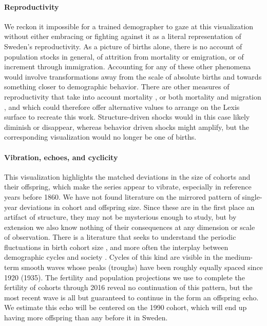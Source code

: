 \documentclass{article}
\begin{document}
\paragraph{Reproductivity}
We reckon it impossible for a trained demographer to gaze at this visualization without either embracing or fighting against it as a literal representation of Sweden's reproductivity. As a picture of births alone, there is no account of population stocks in general, of attrition from mortality or emigration, or of increment through immigration. Accounting for any of these other phenomena would involve transformations away from the scale of absolute births and towards something closer to demographic behavior. There are other measures of reproductivity that take into account mortality \citep{kuczynski1932fertility}, or both mortality and migration \citep[][inter alia]{hyrenius1951reproduction,ortega2007birth,preston2007intrinsic,wilson2013migration,ediev2014new}, and which could therefore offer alternative values to arrange on the Lexis surface to recreate this work. Structure-driven shocks would in this case likely diminish or disappear, whereas behavior driven shocks might amplify, but the corresponding visualization would no longer be one of births. 

\paragraph{Vibration, echoes, and cyclicity}
This visualization highlights the matched deviations in the size of cohorts and their offspring, which make the series appear to vibrate, especially in reference years before 1860. We have not found literature on the mirrored pattern of single-year deviations in cohort and offspring size. Since these are in the first place an artifact of structure, they may not be mysterious enough to study, but by extension we also know nothing of their consequences at any dimension or scale of observation. There is a literature that seeks to understand the periodic fluctuations in birth cohort size \citep[This literature largely derives from][]{lee1974formal}, and more often the interplay between demographic cycles and society \citep[e.g.,][]{easterlin1987birth}. Cycles of this kind are visible in the medium-term smooth waves whose peaks (troughs) have been roughly equally spaced since 1920 (1935). The fertility and population projections we use to complete the fertility of cohorts through 2016 reveal no continuation of this pattern, but the most recent wave is all but guaranteed to continue in the form an offspring echo. We estimate this echo will be centered on the 1990 cohort, which will end up having more offspring than any before it in Sweden.
\end{document}
